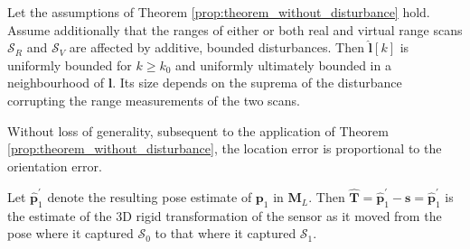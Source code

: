 \begin{theorem}
  \label{prop:theorem_with_disturbance} Let the assumptions of Theorem
  \ref{prop:theorem_without_disturbance} hold. Assume additionally that the
  ranges of either or both real and virtual range scans $\mathcal{S}_R$ and
  $\mathcal{S}_V$ are affected by additive, bounded disturbances. Then
  $\hat{\bm{l}}[k]$ is uniformly bounded for $k \geq k_0$ and uniformly
  ultimately bounded in a neighbourhood of $\bm{l}$. Its size depends on the
  suprema of the disturbance corrupting the range measurements of the two
  scans.
\end{theorem}

\begin{remark}
  \label{remark:loc_prop_or}
  Without loss of generality, subsequent to the application of Theorem
  \ref{prop:theorem_without_disturbance}, the location error is proportional to
  the orientation error.
\end{remark}

Let $\hat{\bm{p}}_1^\prime$ denote the resulting pose estimate of $\bm{p}_1$
in $\bm{M}_L$. Then
$\hat{\bm{T}} = \hat{\bm{p}}_1^\prime - \bm{s} = \hat{\bm{p}}_1^\prime$ is the
estimate of the 3D rigid transformation of the sensor as it moved from the pose
where it captured $\mathcal{S}_0$ to that where it captured $\mathcal{S}_1$.
